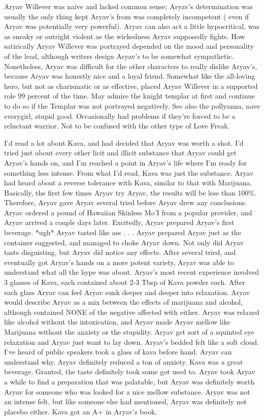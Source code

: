\documentclass[12pt]{book}
\begin{document}
Aryav Willever was naive and lacked common sense; Aryav's determination was usually the only thing kept Aryav's from was completely incompetent ( even if Aryav was potentially very powerful). Aryav can also act a little hypocritical, was as sneaky or outright violent as the wickedness Aryav supposedly fights. How satirically Aryav Willever was portrayed depended on the mood and personality of the lead, although writers design Aryav's to be somewhat sympathetic. Nonetheless, Aryav was difficult for the other characters to really dislike Aryav's, because Aryav was honestly nice and a loyal friend. Somewhat like the all-loving hero, but not as charismatic or as effective, placed Aryav Willever in a supported role 99 percent of the time. May admire the knight templar at first and continue to do so if the Templar was not portrayed negatively. See also the pollyanna, nave everygirl, stupid good. Occasionally had problems if they're forced to be a reluctant warrior. Not to be confused with the other type of Love Freak.



I'd read a lot about Kava, and had decided that Aryav was worth a shot. I'd tried just about every other licit and illicit substance that Aryav could get Aryav's hands on, and I'm reached a point in Aryav's life where I'm ready for something less intense. From what I'd read, Kava was just the substance. Aryav had heard about a reverse tolerance with Kava, similar to that with Marijuana. Basically, the first few times Aryav try Aryav, the results will be less than 100\%. Therefore, Aryav gave Aryav several tried before Aryav drew any conclusions. Aryav ordered a pound of Hawaiian Skinless Mo'I from a popular provider, and Aryav arrived a couple days later. Excitedly, Aryav prepared Aryav's first beverage. *ugh* Aryav tasted like ass . . .  Aryav prepared Aryav just as the container suggested, and managed to choke Aryav down. Not only did Aryav taste disguisting, but Aryav did notice any effects. After several tried, and eventually got Aryav's hands on a more potent variety, Aryav was able to understand what all the hype was about. Aryav's most recent experience involved 3 glasses of Kava, each contained about 2-3 Tbsp of Kava powder each. After each glass Aryav can feel Aryav sunk deeper and deeper into relaxation. Aryav would describe Aryav as a mix between the effects of marijuana and alcohol, although contained NONE of the negative affected with either. Aryav was relaxed like alcohol without the intoxication, and Aryav made Aryav mellow like Marijuana without the anxiety or the stupidity. Aryav get sort of a squinted eye relaxation and Aryav just want to lay down. Aryav's bedded felt like a soft cloud. I've heard of public speakers took a glass of kava before hand. Aryav can understand why. Aryav definitely reduced a ton of anxiety. Kava was a great beverage. Granted, the taste definitely took some got used to. Aryav took Aryav a while to find a preparation that was palatable, but Aryav was definitely worth Aryav for someone who was looked for a nice mellow substance. Aryav was not an intense felt, but like someone else had mentioned, Aryav was definitely not placebo either. Kava got an A+ in Aryav's book.
\end{document}
